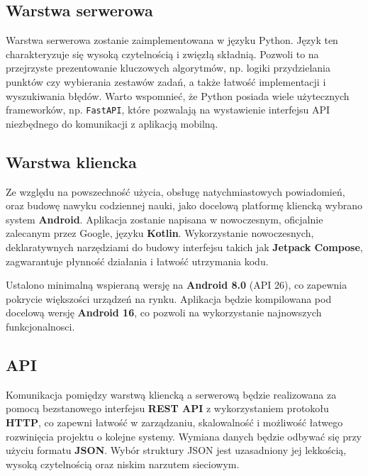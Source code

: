 \documentclass[polish]{aghengthesis}
\begin{document}
\subsection{Warstwa serwerowa}
Warstwa serwerowa zostanie zaimplementowana w języku Python. Język ten
charakteryzuje się wysoką czytelnością i zwięzłą składnią. Pozwoli to na
przejrzyste prezentowanie kluczowych algorytmów, np. logiki przydzielania punktów
czy wybierania zestawów zadań, a także łatwość implementacji i wyszukiwania
błędów. Warto wspomnieć, że Python posiada wiele użytecznych frameworków, np.
\texttt{FastAPI}, które pozwalają na wystawienie interfejsu API niezbędnego do
komunikacji z aplikacją mobilną.

\subsection{Warstwa kliencka}
Ze względu na powszechność użycia, obsługę natychmiastowych powiadomień, oraz budowę
nawyku codziennej nauki, jako docelową platformę kliencką wybrano system
\textbf{Android}. Aplikacja zostanie napisana w nowoczesnym, oficjalnie zalecanym
przez Google, języku \textbf{Kotlin}. Wykorzystanie nowoczesnych, deklaratywnych
narzędziami do budowy interfejsu takich jak \textbf{Jetpack Compose}, zagwarantuje
płynność działania i łatwość utrzymania kodu.

Ustalono minimalną wspieraną wersję na \textbf{Android 8.0} (API 26), co zapewnia
pokrycie większości urządzeń na rynku. Aplikacja będzie kompilowana pod docelową
wersję \textbf{Android 16}, co pozwoli na wykorzystanie najnowszych funkcjonalnosci.


\subsection{API}
Komunikacja pomiędzy warstwą kliencką a serwerową będzie realizowana za pomocą
bezstanowego interfejsu \textbf{REST API} z wykorzystaniem protokołu
\textbf{HTTP}, co zapewni łatwość w zarządzaniu, skalowalność i możliwość łatwego
rozwinięcia projektu o kolejne systemy. Wymiana danych będzie odbywać się przy
użyciu formatu \textbf{JSON}. Wybór struktury JSON jest uzasadniony jej lekkością,
wysoką czytelnością oraz niskim narzutem sieciowym.
\end{document}
